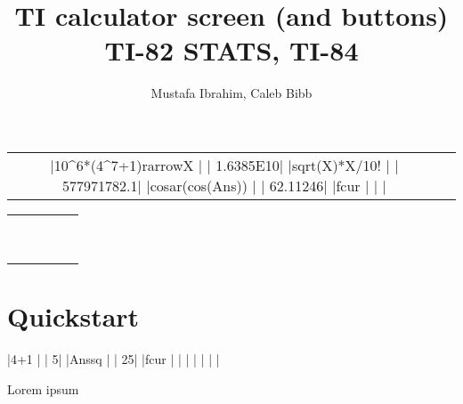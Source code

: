 \documentclass[a4paper,12pt]{article}
\title{TI calculator screen (and buttons)\\{\small TI-82 STATS, TI-84}}
\author{Mustafa Ibrahim, Caleb Bibb}
\begin{document}
\maketitle

\begin{center}
	\begin{tabular}{cc}
		\tiscreen
		|10^6*(4^7+1){rarrow}X  |
		|       1.6385E10|
		|{sqrt}(X)*X/10!      |
		|     577971782.1|
		|cos{ar}(cos(Ans))  |
		|        62.11246|
		|{fcur}               |
		|                |
		&
		\tibtnextramatrix
	\end{tabular}

	\dotfill

	\begin{tabular}{ccccc}
		\tibtnsecond & \tibtnmode   & \tibtndel       &                  &             \\
		\tibtnalpha  & \tibtnxton   & \tibtnstat      &                  &             \\
		\tibtnmath   & \tibtnmatrix & \tibtnprgm      & \tibtnvars       & \tibtnclear \\
		\tibtnxnone  & \tibtnsin    & \tibtncos       & \tibtntan        & \tibtnpower \\
		\tibtnxtwo   & \tibtncomma  & \tibtnleftparen & \tibtnrightparen & \tibtndiv   \\
		\tibtnlog    & \tibtnseven  & \tibtneight     & \tibtnnine       & \tibtntimes \\
		\tibtnln     & \tibtnfour   & \tibtnfive      & \tibtnsix        & \tibtnminus \\
		\tibtnsto    & \tibtnone    & \tibtntwo       & \tibtnthree      & \tibtnplus  \\
		\tibtnon     & \tibtnzero   & \tibtndot       & \tibtnneg        & \tibtnenter \\
	\end{tabular}
\end{center}

\newpage\tableofcontents\newpage

\section{Quickstart}

\begin{SideBySideExample}[xrightmargin=5.5cm]

\tiscreen
|4+1             |
|               5|
|Ans{sq}         |
|              25|
|{fcur}          |
|                |
|                |
|                |

Lorem \tibtnmath{} ipsum

\tibtnextramath
\end{SideBySideExample}
\end{document}
